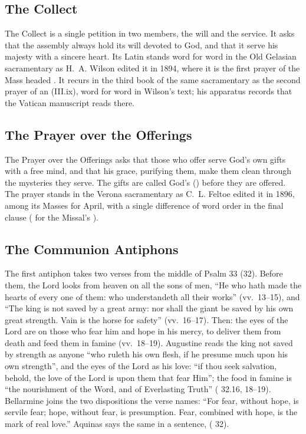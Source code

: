 \subsection{The Collect}

The Collect is a single petition in two members, the will and the service. It
asks that the assembly always hold its will devoted to God, and that it serve
his majesty with a sincere heart. Its Latin stands word for word in the Old
Gelasian sacramentary as H.~A. Wilson edited it in 1894, where it is the first
prayer of the Mass headed . It
recurs in the third book of the same sacramentary as the second prayer of an
 (III.ix), word for word in Wilson's text; his
apparatus records that the Vatican manuscript reads 
there.

\subsection{The Prayer over the Offerings}

The Prayer over the Offerings asks that those who offer serve God's own gifts
with a free mind, and that his grace, purifying them, make them clean through
the mysteries they serve. The gifts are called God's ()
before they are offered. The prayer stands in the Verona sacramentary as C.~L.
Feltoe edited it in 1896, among its Masses for April, with a single difference
of word order in the final clause ( for the
Missal's ).

\subsection{The Communion Antiphons}

The first antiphon takes two verses from the middle of Psalm 33 (32). Before
them, the Lord looks from heaven on all the sons of men, ``He who hath made the
hearts of every one of them: who understandeth all their works'' (vv.~13--15),
and ``The king is not saved by a great army: nor shall the giant be saved by
his own great strength. Vain is the horse for safety'' (vv.~16--17). Then: the
eyes of the Lord are on those who fear him and hope in his mercy, to deliver
them from death and feed them in famine (vv.~18--19). Augustine reads the king
not saved by strength as anyone ``who ruleth his own flesh, if he presume much
upon his own strength'', and the eyes of the Lord as his love: ``if thou seek
salvation, behold, the love of the Lord is upon them that fear Him''; the food
in famine is ``the nourishment of the Word, and of Everlasting Truth''
( 32.16, 18--19). Bellarmine joins the two
dispositions the verse names: ``For fear, without hope, is servile fear; hope,
without fear, is presumption. Fear, combined with hope, is the mark of real
love.'' Aquinas says the same in a sentence,  ( 32).


